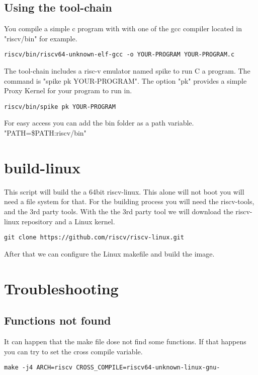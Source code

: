 \documentclass[a4paper, oneside]{scrreprt}
\begin{document}
\section{Using the tool-chain}
You compile a simple c program with with one of the gcc compiler located in "riscv/bin" for example.
\begin{lstlisting}
riscv/bin/riscv64-unknown-elf-gcc -o YOUR-PROGRAM YOUR-PROGRAM.c
\end{lstlisting} 
The tool-chain includes a risc-v emulator named spike to run C a program. The command is "spike pk YOUR-PROGRAM". The option "pk" provides a simple Proxy Kernel for your program to run in.
\begin{lstlisting}
riscv/bin/spike pk YOUR-PROGRAM
\end{lstlisting}
For easy access you can add the bin folder as a path variable. "PATH=\$PATH:riscv/bin"

\chapter{build-linux}
This script will build the a 64bit riscv-linux. This alone will not boot you will need a file system for that. 
For the building process you will need the riscv-tools, and the 3rd party tools. 
With the the 3rd party tool we will download the riscv-linux repository and a Linux kernel.
\begin{lstlisting}
git clone https://github.com/riscv/riscv-linux.git
\end{lstlisting}
After that we can configure the Linux makefile and build the image.


\chapter{Troubleshooting}
\section{Functions not found}
It can happen that the make file dose not find some functions. If that happens you can try to set the cross compile variable.
\begin{lstlisting}
make -j4 ARCH=riscv CROSS_COMPILE=riscv64-unknown-linux-gnu-
\end{lstlisting}
\end{document}

